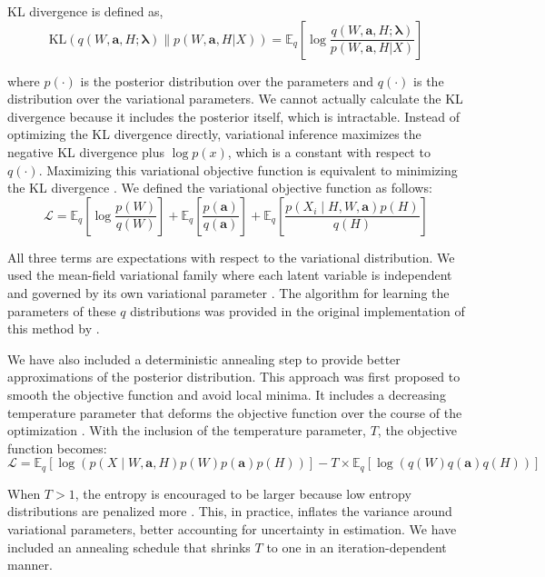 KL divergence is defined as,
\begin{equation}
\mathrm{KL}(q(W, \mathbf{a}, H ; \boldsymbol{\lambda}) \| p(W, \mathbf{a}, H | X))=\mathbb{E}_{q}\left[\log \frac{q(W, \mathbf{a}, H ; \boldsymbol{\lambda})}{p(W, \mathbf{a}, H | X)}\right]
\end{equation} 

where $p(\cdot)$ is the posterior distribution over the parameters and $q(\cdot)$ is the distribution over the variational parameters. We cannot actually calculate the KL divergence because it includes the posterior itself, which is intractable. Instead of optimizing the KL divergence directly, variational inference maximizes the negative KL divergence plus $\log p(x)$, which is a constant with respect to $q(\cdot)$. Maximizing this variational objective function is equivalent to minimizing the KL divergence \cite{blei2017variational}. We defined the variational objective function as follows:
\begin{equation}
\mathcal{L}=\mathbb{E}_{q}\left[\log \frac{p(W)}{q(W)}\right]+\mathbb{E}_{q}\left[\frac{p(\mathbf{a})}{q(\mathbf{a})}\right]+\mathbb{E}_{q}\left[\frac{p\left(X_{i} \mid H, W, \mathbf{a}\right) p(H)}{q(H)}\right]
\end{equation}

All three terms are expectations with respect to the variational distribution. We used the mean-field variational family where each latent variable is independent and governed by its own variational parameter \cite{jordan1999introduction, paisley2014bayesian}. The algorithm for learning the parameters of these $q$ distributions was provided in the original implementation of this method by \citet{holtzman2018machine}.

We have also included a deterministic annealing step to provide better approximations of the posterior distribution. This approach was first proposed to smooth the objective function and avoid local minima. It includes a decreasing temperature parameter that deforms the objective function over the course of the optimization \cite{rose1990deterministic}. With the inclusion of the temperature parameter, $T$, the objective function becomes:
\begin{equation}
\mathcal{L} = \mathbb{E}_{q}
\left[\log\left(p(X \mid W, \mathbf{a}, H)p(W)p(\mathbf{a})p(H)\right)\right] - T \times
\mathbb{E}_{q}\left[\log\left(q(W)q(\mathbf{a})q(H)\right)\right]
\end{equation}

When $T > 1$, the entropy is encouraged to be larger because low entropy distributions are penalized more \cite{mandt2016variational}. This, in practice, inflates the variance around variational parameters, better accounting for uncertainty in estimation. We have included an annealing schedule that shrinks $T$ to one in an iteration-dependent manner.

